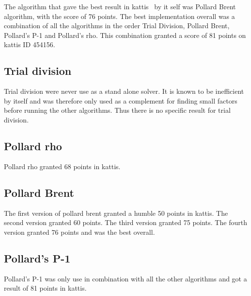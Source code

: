The algorithm that gave the best result in kattis~\cite{kattis} by it self was Pollard Brent algorithm, with the score of 76 points. The best implementation overall was a combination of all the algorithms in the order Trial Division, Pollard Brent, Pollard’s P-1 and Pollard’s rho. This combination granted a score of 81 points on kattis ID 454156.

\subsection{Trial division}

Trial division were never use as a stand alone solver. It is known to be inefficient by itself and was therefore only used as a complement for finding small factors before running the other algorithms. Thus there is no specific result for trial division.

\subsection{Pollard rho}

Pollard rho granted 68 points in kattis.

\subsection{Pollard Brent}

The first version of pollard brent granted a humble 50 points in kattis. The second version granted 60 points. The third version granted 75 points. The fourth version granted 76 points and was the best overall.

\subsection{Pollard's P-1}

Pollard’s P-1 was only use in combination with all the other algorithms and got a result of 81 points in kattis.

